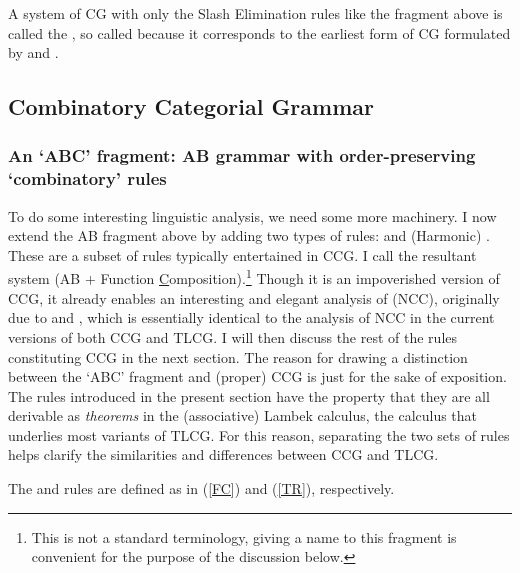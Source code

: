 \documentclass[output=paper]{langsci/langscibook}
\begin{document}
\noindent
A system of CG with only the Slash Elimination rules like the fragment
above is called the , so called because it corresponds to
the earliest form of CG formulated by
\citet{Ajdukiewicz35a-u} and \citet{bar-hillel53}.


\subsection{Combinatory Categorial Grammar \label{sec:CCG}}

\subsubsection{An `ABC' fragment: AB grammar with order-preserving `combinatory' rules \label{preCCG}}

To do some interesting linguistic analysis, we need some more
machinery. I now extend the AB fragment above by adding two types of
rules:  and (Harmonic) . These are
a subset of rules typically entertained in CCG. I call the resultant
system  (AB + Function
\underline{C}omposition).\footnote{This is not a standard terminology,
giving a name to this fragment is convenient for the purpose of the
discussion below.} Though it is an impoverished version of CCG, it
already enables an interesting and elegant analysis of
 (NCC), originally due to \citet{Steedman85a-u} and
\citet{Dowty88a-u}, which is essentially identical to the analysis of NCC in
the current versions of both CCG and TLCG. I will then discuss the
rest of the rules constituting CCG in the next section. The reason for
drawing a distinction between the `ABC' fragment and (proper) CCG is
just for the sake of exposition. The rules introduced in the present
section have the property that they are all derivable as \emph{theorems} in
the (associative) Lambek calculus, the calculus that underlies most
variants of TLCG. For this reason, separating the two sets of rules
helps clarify the similarities and differences between CCG and TLCG.

The  and  rules are defined as in
(\ref{FC}) and (\ref{TR}), respectively. 
\end{document}
